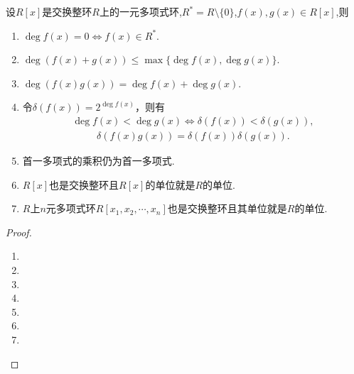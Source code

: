 \documentclass[../../main.tex]{subfiles}%
\begin{document}
\begin{theorem}\label{theorem:域上一元多项式的基本性质}
设$R[x]$是交换整环$R$上的一元多项式环,$R^*=R\setminus \{0\}$,$f(x),g(x)\in R[x]$,则
\begin{enumerate}[(1)]
\item $\deg f(x) = 0\iff f(x) \in R^*$.

\item $\deg(f(x) + g(x)) \leqslant \max\{\deg f(x), \deg g(x)\}$.

\item $\deg(f(x)g(x)) = \deg f(x) + \deg g(x)$.

\item\label{theorem:域上一元多项式的基本性质-4} 令$\delta(f(x)) = 2^{\deg f(x)}$，则有
\begin{align*}
\deg f(x) < \deg g(x) \iff \delta(f(x)) < \delta(g(x)),
\end{align*}
\begin{align*}
\delta(f(x)g(x)) = \delta(f(x))\delta(g(x)).
\end{align*}

\item  首一多项式的乘积仍为首一多项式.

\item $R[x]$也是交换整环且$R[x]$的单位就是$R$的单位.

\item $R$上$n$元多项式环$R[x_1, x_2, \cdots, x_n]$也是交换整环且其单位就是$R$的单位.
\end{enumerate}
\end{theorem}
\begin{proof}
\begin{enumerate}[(1)]
\item 

\item 

\item 

\item 

\item 

\item 

\item 
\end{enumerate}
\end{proof}
\end{document}
